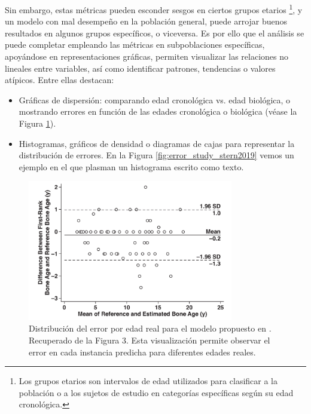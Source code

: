 Sin embargo, estas métricas pueden esconder sesgos en ciertos grupos etarios%
\footnote{
    Los grupos etarios son intervalos de edad utilizados para clasificar a la población o a los sujetos de estudio en categorías específicas según su edad cronológica.
}, 
y un modelo con mal desempeño en la población general, puede arrojar buenos resultados en algunos grupos específicos, o viceversa. Es por ello que el análisis se puede completar empleando las métricas en subpoblaciones específicas, apoyándose en representaciones gráficas, permiten visualizar las relaciones no lineales entre variables, así como identificar patrones, tendencias o valores atípicos. Entre ellas destacan: 

\begin{itemize}

    \item Gráficas de dispersión: comparando edad cronológica vs. edad biológica, o mostrando errores en función de las edades cronológica o biológica (véase la Figura \ref{fig:error_distribution_by_age}).

    \item Histogramas, gráficos de densidad o diagramas de cajas para representar la distribución de errores. En la Figura \ref{fig:error_study_stern2019} vemos un ejemplo en el que plasman un histograma escrito como texto.

\end{itemize}

\begin{figure}[h]
    \centering
    \includegraphics[width=0.8\textwidth]{capitulos/cap_03/imagenes/error_distribution.png}
    \caption[
        Distribución del error por edad real para el modelo propuesto en \cite{kim2017}. 
    ]{
        Distribución del error por edad real para el modelo propuesto en \cite{kim2017}. 
        Recuperado de la Figura 3.  
        Esta visualización permite observar el error en cada instancia predicha para diferentes edades reales. 
    }
    \label{fig:error_distribution_by_age}
\end{figure}

